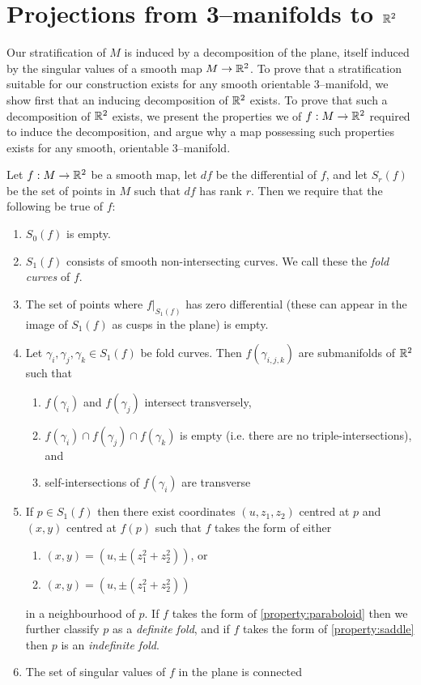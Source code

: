 \section{Projections from 3--manifolds to $\mathbb{R}^2$}
\label{section:smooth-projection}

Our stratification of $M$ is induced by a decomposition of the plane, itself induced by the singular values of a smooth map $M\to\mathbb{R}^2$.
To prove that a stratification suitable for our construction exists for any smooth orientable 3--manifold, we show first that an inducing decomposition of $\mathbb{R}^2$ exists.
To prove that such a decomposition of $\mathbb{R}^2$ exists, we present the properties we of $f:M\to\mathbb{R}^2$ required to induce the decomposition, and argue why a map possessing such properties exists for any smooth, orientable 3--manifold.

Let $f:M\to\mathbb{R}^2$ be a smooth map, let $df$ be the differential of $f$, and let $S_r(f)$ be the set of points in $M$ such that $df$ has rank $r$.
Then we require that the following be true of $f$:
\begin{enumerate}
	\item $S_0(f)$ is empty.
	
	\item $S_1(f)$ consists of smooth non-intersecting curves.  We call these the \emph{fold curves} of $f$.
	
	\item The set of points where $f|_{S_1(f)}$ has zero differential (these can appear in the image of $S_1(f)$ as cusps in the plane) is empty.
	
	\item Let $\gamma_i, \gamma_j, \gamma_k \in S_1(f)$ be fold curves. Then $f(\gamma_{i,j,k})$ are submanifolds of $\mathbb{R}^2$ such that
	\begin{enumerate}
		\item $f(\gamma_i)$ and $f(\gamma_j)$ intersect transversely,
		
		\item $f(\gamma_i)\cap f(\gamma_j)\cap f(\gamma_k)$ is empty (i.e. there are no triple-intersections), and
		
		\item self-intersections of $f(\gamma_i)$ are transverse
	\end{enumerate}
	
	\item If $p\in S_1(f)$ then there exist coordinates $(u, z_1, z_2)$ centred at $p$ and $(x,y)$ centred at $f(p)$ such that $f$ takes the form of either
	\begin{enumerate}
		\item\label{property:paraboloid} $(x,y)=(u,\pm(z_1^2+z_2^2))$, or
		\item\label{property:saddle} $(x,y)=(u,\pm(z_1^2+z_2^2))$
	\end{enumerate}
	in a neighbourhood of $p$.
	If $f$ takes the form of \ref{property:paraboloid} then we further classify $p$ as a \emph{definite fold}, and if $f$ takes the form of \ref{property:saddle} then $p$ is an \emph{indefinite fold}.
	
	\item The set of singular values of $f$ in the plane is connected
\end{enumerate}


